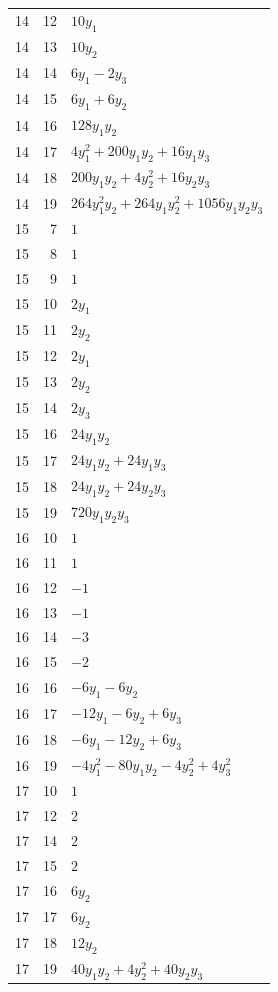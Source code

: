 \documentclass[10pt,a4paper]{article}
\begin{document}
{\begin{longtable}{rrp{125mm}}
14 & 12 & $10 y_{1}$\\
14 & 13 & $10 y_{2}$\\
14 & 14 & $6 y_{1} - 2 y_{3}$\\
14 & 15 & $6 y_{1} + 6 y_{2}$\\
14 & 16 & $128 y_{1} y_{2}$\\
14 & 17 & $4 y_{1}^{2} + 200 y_{1} y_{2} + 16 y_{1} y_{3}$\\
14 & 18 & $200 y_{1} y_{2} + 4 y_{2}^{2} + 16 y_{2} y_{3}$\\
14 & 19 & $264 y_{1}^{2} y_{2} + 264 y_{1} y_{2}^{2} + 1056 y_{1} y_{2} y_{3}$\\
15 & 7 & $1$\\
15 & 8 & $1$\\
15 & 9 & $1$\\
15 & 10 & $2 y_{1}$\\
15 & 11 & $2 y_{2}$\\
15 & 12 & $2 y_{1}$\\
15 & 13 & $2 y_{2}$\\
15 & 14 & $2 y_{3}$\\
15 & 16 & $24 y_{1} y_{2}$\\
15 & 17 & $24 y_{1} y_{2} + 24 y_{1} y_{3}$\\
15 & 18 & $24 y_{1} y_{2} + 24 y_{2} y_{3}$\\
15 & 19 & $720 y_{1} y_{2} y_{3}$\\
16 & 10 & $1$\\
16 & 11 & $1$\\
16 & 12 & $-1$\\
16 & 13 & $-1$\\
16 & 14 & $-3$\\
16 & 15 & $-2$\\
16 & 16 & $- 6 y_{1} - 6 y_{2}$\\
16 & 17 & $- 12 y_{1} - 6 y_{2} + 6 y_{3}$\\
16 & 18 & $- 6 y_{1} - 12 y_{2} + 6 y_{3}$\\
16 & 19 & $- 4 y_{1}^{2} - 80 y_{1} y_{2} - 4 y_{2}^{2} + 4 y_{3}^{2}$\\
17 & 10 & $1$\\
17 & 12 & $2$\\
17 & 14 & $2$\\
17 & 15 & $2$\\
17 & 16 & $6 y_{2}$\\
17 & 17 & $6 y_{2}$\\
17 & 18 & $12 y_{2}$\\
17 & 19 & $40 y_{1} y_{2} + 4 y_{2}^{2} + 40 y_{2} y_{3}$\\

\end{longtable}}
\end{document}
